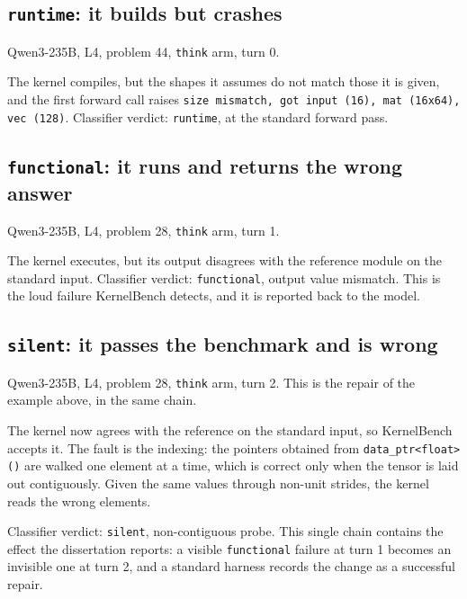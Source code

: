 \documentclass[12pt]{article}
\begin{document}
\subsection*{\texttt{runtime}: it builds but crashes}

\noindent Qwen3-235B, L4, problem 44, \texttt{think} arm, turn 0.



\noindent The kernel compiles, but the shapes it assumes do not match those it
is given, and the first forward call raises \texttt{size mismatch, got input
(16), mat (16x64), vec (128)}. Classifier verdict: \texttt{runtime}, at the
standard forward pass.

\subsection*{\texttt{functional}: it runs and returns the wrong answer}

\noindent Qwen3-235B, L4, problem 28, \texttt{think} arm, turn 1.



\noindent The kernel executes, but its output disagrees with the reference
module on the standard input. Classifier verdict: \texttt{functional}, output
value mismatch. This is the loud failure KernelBench detects, and it is
reported back to the model.

\subsection*{\texttt{silent}: it passes the benchmark and is wrong}

\noindent Qwen3-235B, L4, problem 28, \texttt{think} arm, turn 2. This is
the repair of the example above, in the same chain.



\noindent The kernel now agrees with the reference on the standard input, so
KernelBench accepts it. The fault is the indexing: the pointers obtained from
\texttt{data\_ptr<float>()} are walked one element at a time, which is correct
only when the tensor is laid out contiguously. Given the same values through
non-unit strides, the kernel reads the wrong elements.

\noindent Classifier verdict: \texttt{silent}, non-contiguous probe. This
single chain contains the effect the dissertation reports: a visible
\texttt{functional} failure at turn 1 becomes an invisible one at turn 2, and a
standard harness records the change as a successful repair.
\end{document}
